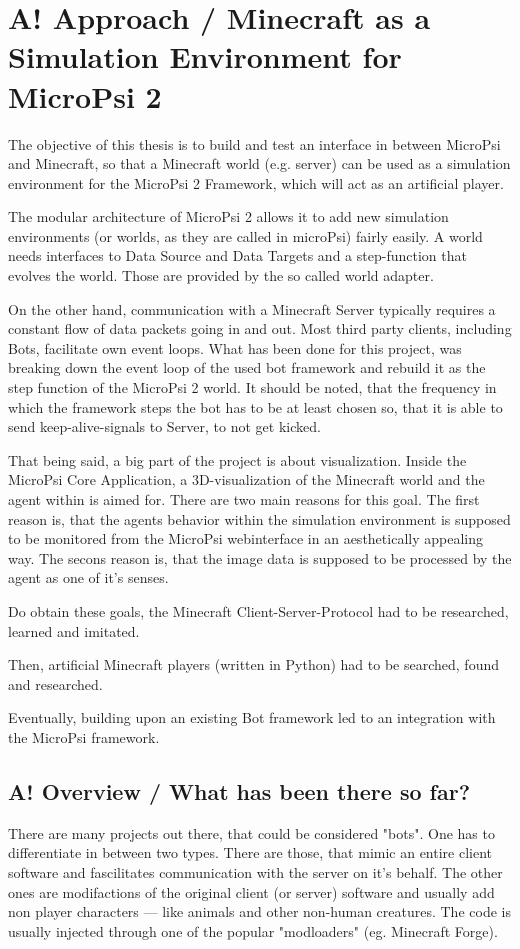 \chapter{A! Approach / Minecraft as a Simulation Environment for MicroPsi 2}

The objective of this thesis is to build and test an interface in between MicroPsi and Minecraft, so that a Minecraft world (e.g. server) can be used as a simulation environment for the MicroPsi 2 Framework, which will act as an artificial player.

The modular architecture of MicroPsi 2 allows it to add new simulation environments (or worlds, as they are called in microPsi) fairly easily. A world needs interfaces to Data Source and Data Targets and a step-function that evolves the world. Those are provided by the so called world adapter. 

On the other hand, communication with a Minecraft Server typically requires a constant flow of data packets going in and out. Most third party clients, including Bots, facilitate own event loops. What has been done for this project, was breaking down the event loop of the used bot framework and rebuild it as the step function of the MicroPsi 2 world. It should be noted, that the frequency in which the framework steps the bot has to be at least chosen so, that it is able to send keep-alive-signals to Server, to not get kicked.

That being said, a big part of the project is about visualization. Inside the MicroPsi Core Application, a 3D-visualization of the Minecraft world and the agent within is aimed for. There are two main reasons for this goal. The first reason is, that the agents behavior within the simulation environment is supposed to be monitored from the MicroPsi webinterface in an aesthetically appealing way. The secons reason is, that the image data is supposed to be processed by the agent as one of it's senses.

Do obtain these goals, the Minecraft Client-Server-Protocol had to be researched, learned and imitated.

Then, artificial Minecraft players (written in Python) had to be searched, found and researched.

Eventually, building upon an existing Bot framework led to an integration with the MicroPsi framework.

\section{A! Overview / What has been there so far?}
There are many projects out there, that could be considered "bots". One has to differentiate in between two types. There are those, that mimic an entire client software and fascilitates communication with the server on it's behalf. The other ones are modifactions of the original client (or server) software and usually add non player characters --- like animals and other non-human creatures. The code is usually injected through one of the popular "modloaders" (eg. Minecraft Forge).

